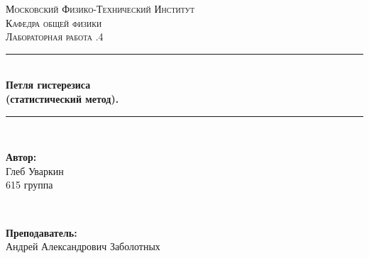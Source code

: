 \documentclass[a4paper, 12pt, twoside]{article}
\begin{document}
\begin{titlepage}

\newcommand{\HRule}{\rule{\linewidth}{0.7mm}} %

\center %
 

\textsc{\LARGE Московский Физико-Технический Институт}\\[1,5cm] %
\textsc{\Large Кафедра общей физики}\\[0.5cm] %
\textsc{\large Лабораторная работа .4}\\[0.5cm] %


\HRule
\\[0.4cm]
{ \huge \bfseries Петля гистерезиса \\(статистический метод).}
\\[0.2cm] %
\HRule
\\[1.5cm]


 

\begin{minipage}{0.4\textwidth}
	\begin{flushleft} \large
		\textbf{Автор:}\\
		Глеб Уваркин \\
		615 группа
	\end{flushleft}
\end{minipage}
~
\begin{minipage}{0.4\textwidth}
	\begin{flushright} \large
		\textbf {Преподаватель:} \\
		Андрей Александрович Заболотных %
	\end{flushright}
\end{minipage}


\end{titlepage}
\end{document}
